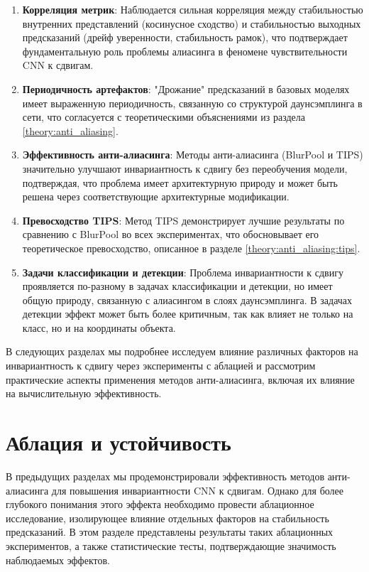 \begin{enumerate}
    \item \textbf{Корреляция метрик}: Наблюдается сильная корреляция между стабильностью внутренних представлений (косинусное сходство) и стабильностью выходных предсказаний (дрейф уверенности, стабильность рамок), что подтверждает фундаментальную роль проблемы алиасинга в феномене чувствительности CNN к сдвигам.
    
    \item \textbf{Периодичность артефактов}: "Дрожание" предсказаний в базовых моделях имеет выраженную периодичность, связанную со структурой даунсэмплинга в сети, что согласуется с теоретическими объяснениями из раздела \ref{theory:anti_aliasing}.
    
    \item \textbf{Эффективность анти-алиасинга}: Методы анти-алиасинга (BlurPool и TIPS) значительно улучшают инвариантность к сдвигу без переобучения модели, подтверждая, что проблема имеет архитектурную природу и может быть решена через соответствующие архитектурные модификации.
    
    \item \textbf{Превосходство TIPS}: Метод TIPS демонстрирует лучшие результаты по сравнению с BlurPool во всех экспериментах, что обосновывает его теоретическое превосходство, описанное в разделе \ref{theory:anti_aliasing:tips}.
    
    \item \textbf{Задачи классификации и детекции}: Проблема инвариантности к сдвигу проявляется по-разному в задачах классификации и детекции, но имеет общую природу, связанную с алиасингом в слоях даунсэмплинга. В задачах детекции эффект может быть более критичным, так как влияет не только на класс, но и на координаты объекта.
\end{enumerate}

В следующих разделах мы подробнее исследуем влияние различных факторов на инвариантность к сдвигу через эксперименты с аблацией и рассмотрим практические аспекты применения методов анти-алиасинга, включая их влияние на вычислительную эффективность. 

\section{Аблация и устойчивость}
\label{experiments:ablation}

В предыдущих разделах мы продемонстрировали эффективность методов анти-алиасинга для повышения инвариантности CNN к сдвигам. Однако для более глубокого понимания этого эффекта необходимо провести аблационное исследование, изолирующее влияние отдельных факторов на стабильность предсказаний. В этом разделе представлены результаты таких аблационных экспериментов, а также статистические тесты, подтверждающие значимость наблюдаемых эффектов.


